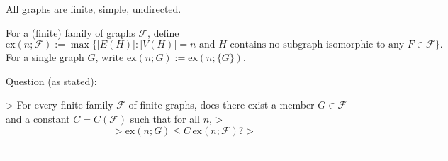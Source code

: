 All graphs are finite, simple, undirected.

For a (finite) family of graphs $\mathcal F$, define
\[
\mathrm{ex}(n;\mathcal F):=\max\{|E(H)|: |V(H)|=n\text{ and }H\text{ contains no subgraph isomorphic to any }F\in\mathcal F\}.
\]
For a single graph $G$, write $\mathrm{ex}(n;G):=\mathrm{ex}(n;\{G\})$.

Question (as stated):

> For every finite family $\mathcal F$ of finite graphs, does there exist a member $G\in\mathcal F$ and a constant $C=C(\mathcal F)$ such that for all $n$,
> \[
> \mathrm{ex}(n;G)\le C\,\mathrm{ex}(n;\mathcal F)?
> \]

---
